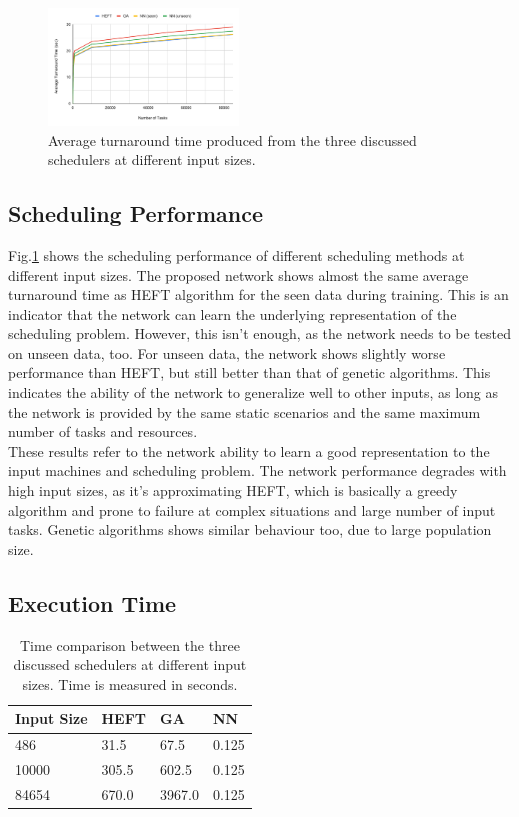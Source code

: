 \begin{figure}[hp]
    \centering
    \includegraphics[width=0.45\textwidth]{diagrams/ta_chart}
    \caption{Average turnaround time produced from the three discussed schedulers at different input sizes.}
    \label{fig:ta_chart}
\end{figure}

\subsection{Scheduling Performance}

Fig.\ref{fig:ta_chart} shows the scheduling performance of different scheduling methods at different input sizes. The proposed network shows almost the same average turnaround time as HEFT algorithm for the seen data during training. This is an indicator that the network can learn the underlying representation of the scheduling problem. However, this isn't enough, as the network needs to be tested on unseen data, too. For unseen data, the network shows slightly worse performance than HEFT, but still better than that of genetic algorithms. This indicates the ability of the network to generalize well to other inputs, as long as the network is provided by the same static scenarios and the same maximum number of tasks and resources. \\

These results refer to the network ability to learn a good representation to the input machines and scheduling problem. The network performance degrades with high input sizes, as it's approximating HEFT, which is basically a greedy algorithm and prone to failure at complex situations and large number of input tasks. Genetic algorithms shows similar behaviour too, due to large population size.

\subsection{Execution Time}
\begin{table}
  \caption{Time comparison between the three discussed schedulers at different input sizes. Time is measured in seconds.}
  \label{tab:exec_time}
  \centering
  \begin{tabular}{l l l l}
    \toprule
    Input Size & HEFT & GA & NN \\
    \midrule
    486	& 31.5 & 67.5 & 0.125 \\
    10000 & 305.5 & 602.5 & 0.125 \\
    84654 & 670.0 & 3967.0 & 0.125 \\
    \bottomrule
  \end{tabular}
\end{table}

